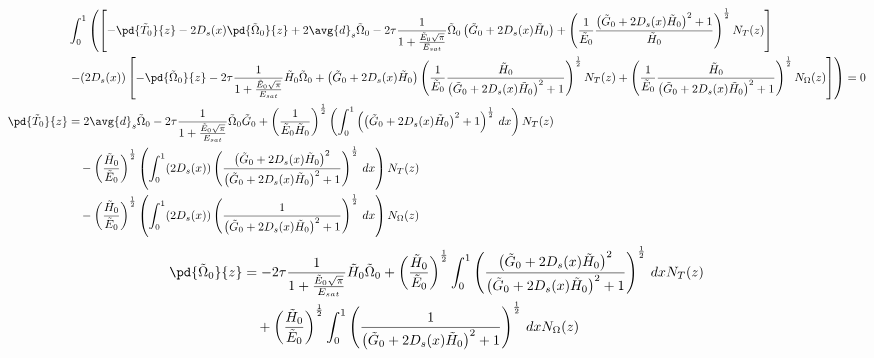 \begin{equation}
\begin{split}
&\int_{0}^{1} \left( \left[- \pd{\tilde{T}_0}{z} - 2 D_s(x) \pd{\tilde{\Omega}_0}{z} + 2 \avg{d}_s \tilde{\Omega}_0 - 2 \tau \frac{1}{1+\frac{\tilde{E}_0\sqrt{\pi}}{E_{sat}}} \tilde{\Omega}_0 \left(\tilde{G}_0+ 2 D_s(x) \tilde{H}_0\right) + \left(\frac{1}{\tilde{E}_0}\frac{\left(\tilde{G}_0+ 2 D_s(x) \tilde{H}_0\right)^2+1}{\tilde{H}_0}\right)^{\frac{1}{2}} N_T(z) \right] \right. \\
&\left. - (2 D_s(x)) \left[-\pd{\tilde{\Omega}_0}{z} - 2 \tau \frac{1}{1+\frac{\tilde{E}_0\sqrt{\pi}}{E_{sat}}} \tilde{H}_0 \tilde{\Omega}_0 + \left(\tilde{G}_0+ 2 D_s(x) \tilde{H}_0\right)\left(\frac{1}{\tilde{E}_0}\frac{\tilde{H}_0}{\left(\tilde{G}_0+ 2 D_s(x) \tilde{H}_0\right)^2+1}\right)^{\frac{1}{2}} N_T(z) + \left(\frac{1}{\tilde{E}_0}\frac{\tilde{H}_0}{\left(\tilde{G}_0+ 2 D_s(x) \tilde{H}_0\right)^2+1}\right)^{\frac{1}{2}}N_\Omega(z)\right]\right) = 0\\
\pd{\tilde{T}_0}{z} &=  2\avg{d}_s \tilde{\Omega}_0 - 2 \tau \frac{1}{1+\frac{\tilde{E}_0\sqrt{\pi}}{E_{sat}}} \tilde{\Omega}_0 \tilde{G}_0  + \left(\frac{1}{\tilde{E}_0 \tilde{H}_0}\right)^{\frac{1}{2}} \left(\int_{0}^{1} \left(\left(\tilde{G}_0+ 2 D_s(x) \tilde{H}_0\right)^2+1\right)^{\frac{1}{2}} \,dx \right) N_T(z) \\
&\quad- \left(\frac{\tilde{H}_0}{\tilde{E}_0}\right)^{\frac{1}{2}} \left(\int_{0}^{1} (2 D_s(x)) \left(\frac{\left(\tilde{G}_0+ 2 D_s(x) \tilde{H}_0\right)^2}{\left(\tilde{G}_0+ 2 D_s(x) \tilde{H}_0\right)^2+1}\right)^{\frac{1}{2}}\,dx\right) N_T(z) \\
&\quad- \left(\frac{\tilde{H}_0}{\tilde{E}_0}\right)^{\frac{1}{2}} \left(\int_{0}^{1} (2 D_s(x)) \left(\frac{1}{\left(\tilde{G}_0+ 2 D_s(x) \tilde{H}_0\right)^2+1}\right)^{\frac{1}{2}} \,dx \right) N_\Omega(z) \\
\end{split}
\end{equation}
\begin{equation}
\begin{split}
\pd{\tilde{\Omega}_0}{z} &= - 2 \tau \frac{1}{1+\frac{\tilde{E}_0\sqrt{\pi}}{E_{sat}}} \tilde{H}_0 \tilde{\Omega}_0 + \left(\frac{\tilde{H}_0}{\tilde{E}_0}\right)^\frac{1}{2} \int_{0}^{1}\left(\frac{\left(\tilde{G}_0+ 2 D_s(x) \tilde{H}_0\right)^2}{\left(\tilde{G}_0+ 2 D_s(x) \tilde{H}_0\right)^2+1}\right)^{\frac{1}{2}} \,dx N_T(z) \\
&\quad+ \left(\frac{\tilde{H}_0}{\tilde{E}_0}\right)^\frac{1}{2}  \int_{0}^{1} \left(\frac{1}{\left(\tilde{G}_0+ 2 D_s(x) \tilde{H}_0\right)^2+1}\right)^{\frac{1}{2}} \, dx N_\Omega(z)\\
\end{split}
\end{equation}
